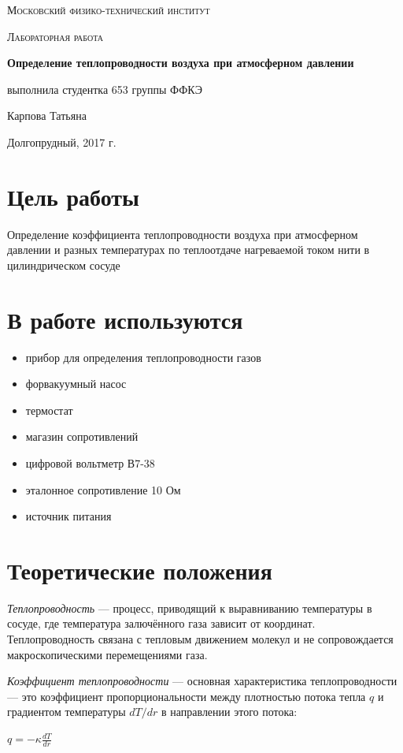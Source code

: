 \documentclass{article}
\begin{document}
\begin{titlepage}
	\centering
	{\scshape\LARGE Московский физико-технический институт \par}
	\vspace{3cm}
	{\scshape\Large Лабораторная работа \par}
	\vspace{1cm}
	{\huge\bfseries Определение теплопроводности воздуха при атмосферном давлении \par}
	\vspace{1cm}
	\vfill
\begin{flushright}
	{\large выполнила студентка 653 группы ФФКЭ}\par
	\vspace{0.3cm}
	{\LARGE Карпова Татьяна}
\end{flushright}
	

	\vfill

	Долгопрудный, 2017 г.
\end{titlepage}

\section{Цель работы}
Определение коэффициента теплопроводности воздуха при атмосферном давлении и разных температурах по теплоотдаче нагреваемой током нити в цилиндрическом сосуде

\section{В работе используются}
\begin{itemize}
    \item прибор для определения теплопроводности газов
    \item форвакуумный насос
    \item термостат
    \item магазин сопротивлений
    \item цифровой вольтметр В7-38
    \item эталонное сопротивление 10 Ом
    \item источник питания
    
\end{itemize}

\section{Теоретические положения}

{\it Теплопроводность} --- процесс, приводящий к выравниванию температуры в сосуде, где температура залючённого газа зависит от координат. Теплопроводность связана с тепловым движением молекул и не сопровождается макроскопическими перемещениями газа. \par
{\it Коэффициент теплопроводности} --- основная характеристика теплопроводности --- это коэффициент пропорциональности между плотностью потока тепла $q$ и градиентом температуры $dT/dr$ в направлении этого потока:
\begin{center}
$q = -\kappa \frac{dT}{dr}$
\end{center} \par
\end{document}
